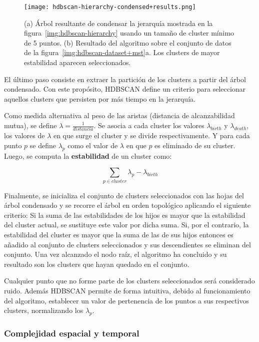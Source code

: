 \begin{figure}[!h]
    \centering
    \texttt{[image: hdbscan-hierarchy-condensed+results.png]}
    \caption{(a) Árbol resultante de condensar la jerarquía mostrada en la figura~\ref{img:hdbscan-hierarchy} usando un tamaño de cluster mínimo de 5 puntos. (b) Resultado del algoritmo sobre el conjunto de datos de la figura~\ref{img:hdbscan-dataset+mst}a.
    Los clusters de mayor estabilidad aparecen seleccionados.}
    \label{img:hdbscan-hierarchy-condensed+results}
\end{figure}

El último paso consiste en extraer la partición de los clusters a partir del árbol condensado.
Con este propósito, HDBSCAN define un criterio para seleccionar aquellos clusters que persisten por más tiempo en la jerarquía.

Como medida alternativa al peso de las aristas (distancia de alcanzabilidad mutua), se define $\lambda=\frac{1}{distancia}$.
Se asocia a cada cluster los valores $\lambda_{birth}$ y $\lambda_{death}$, los valores de $\lambda$ en que surge el cluster y se divide respectivamente.
Y para cada punto $p$ se define $\lambda_p$ como el valor de $\lambda$ en que $p$ es eliminado de su cluster.
Luego, se computa la \textbf{estabilidad} de un cluster como:

\begin{equation*}
    \sum_{p\in cluster}{\lambda_p - \lambda_{birth}}
\end{equation*}

Finalmente, se inicializa el conjunto de clusters seleccionados con las hojas del árbol condensado y se recorre el árbol en orden topológico aplicando el siguiente criterio:
Si la suma de las estabilidades de los hijos es mayor que la estabilidad del cluster actual, se sustituye este valor por dicha suma.
Si, por el contrario, la estabilidad del cluster es mayor que la suma de las de sus hijos entonces es añadido al conjunto de clusters seleccionados y sus descendientes se eliminan del conjunto.
Una vez alcanzado el nodo raíz, el algoritmo ha concluido y su resultado son los clusters que hayan quedado en el conjunto.

Cualquier punto que no forme parte de los clusters seleccionados será considerado ruido.
Además HDBSCAN permite de forma intuitiva, debido al funcionamiento del algoritmo, establecer un valor de pertenencia de los puntos a sus respectivos clusters, normalizando los $\lambda_p$.

\subsubsection{Complejidad espacial y temporal}

